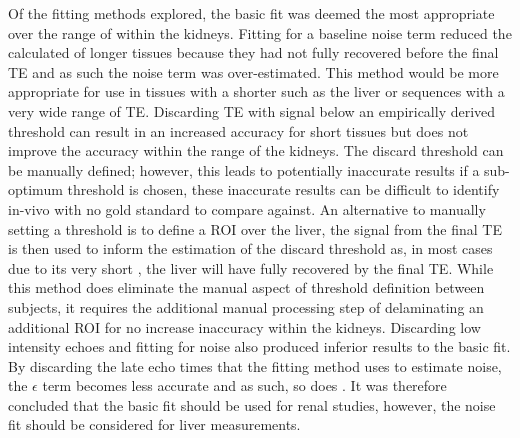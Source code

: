 Of the fitting methods explored, the basic fit was deemed the most appropriate over the range of \ttwo within the kidneys. Fitting for a baseline noise term reduced the calculated \ttwo of longer \ttwo tissues because they had not fully recovered before the final \ac{TE} and as such the noise term was over-estimated. This method would be more appropriate for use in tissues with a shorter \ttwo such as the liver or sequences with a very wide range of \ac{TE}. Discarding \ac{TE} with signal below an empirically derived threshold can result in an increased accuracy for short \ttwo tissues but does not improve the accuracy within the range of the kidneys. The discard threshold can be manually defined; however, this leads to potentially inaccurate results if a sub-optimum threshold is chosen, these inaccurate results can be difficult to identify in-vivo with no gold standard to compare against. An alternative to manually setting a threshold is to define a \ac{ROI} over the liver, the signal from the final \ac{TE} is then used to inform the estimation of the discard threshold as, in most cases due to its very short \ttwo, the liver will have fully recovered by the final \ac{TE}. While this method does eliminate the manual aspect of threshold definition between subjects, it requires the additional manual processing step of delaminating an additional \ac{ROI} for no increase inaccuracy within the kidneys. Discarding low intensity echoes and fitting for noise also produced inferior results to the basic fit. By discarding the late echo times that the fitting method uses to estimate noise, the $\epsilon$ term becomes less accurate and as such, so does \ttwo. It was therefore concluded that the basic fit should be used for renal studies, however, the noise fit should be considered for liver \ttwo measurements.

